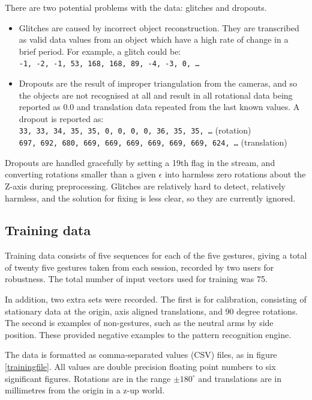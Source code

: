 \documentclass[12pt,a4,notitlepage]{report}
\renewcommand{\_}{\texttt{\symbol{95}}}
\newcommand{\<}{\texttt{\symbol{60}}}
\renewcommand{\>}{\texttt{\symbol{62}}}
\begin{document}
There are two potential problems with the data: glitches and dropouts. 
\begin{itemize}
\item Glitches are caused by incorrect object reconstruction. They are transcribed as valid data values from an object which have a high rate of change in a brief period. For example, a glitch could be: \\
\texttt{-1, -2, -1, 53, 168, 168, 89, -4, -3, 0, \ldots}

\item Dropouts are the result of improper triangulation from the cameras, and so the objects are not recognised at all and result in all rotational data being reported as 0.0 and translation data repeated from the last known values. A dropout is reported as: \\
\texttt{33, 33, 34, 35, 35, 0, 0, 0, 0, 36, 35, 35, \ldots} (rotation) \\
\texttt{697, 692, 680, 669, 669, 669, 669, 669, 669, 624, \ldots} (translation)
\end{itemize}

Dropouts are handled gracefully by setting a 19th flag in the stream, and converting rotations smaller than a given $\epsilon$ into harmless zero rotations about the Z-axis during preprocessing. Glitches are relatively hard to detect, relatively harmless, and the solution for fixing is less clear, so they are currently ignored.

\subsection{Training data}

Training data consists of five sequences for each of the five gestures, giving a total of twenty five gestures taken from each session, recorded by two users for robustness. The total number of input vectors used for training was 75.

In addition, two extra sets were recorded. The first is for calibration, consisting of stationary data at the origin, axis aligned translations, and 90 degree rotations. The second is examples of non-gestures, such as the neutral arms by side position. These provided negative examples to the pattern recognition engine.

The data is formatted as comma-separated values (CSV) files, as in figure \ref{trainingfile}. All values are double precision floating point numbers to six significant figures. Rotations are in the range $ \pm 180^{\circ}$ and translations are in millimetres from the origin in a z-up world.
\end{document}
